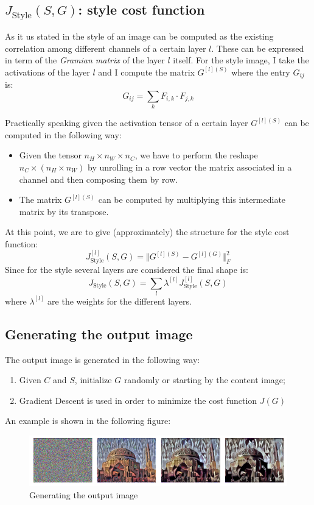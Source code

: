 \subsection{$J_{\text{Style}}(S,G)$: style cost function}
As it us stated in \cite{gatys2015neural} the style of an image can be computed as the existing correlation among different channels of a certain layer $l$. These can be expressed in term of the \textit{Gramian matrix} of the layer $l$ itself. For the style image, I take the activations of the layer $l$ and I compute the matrix $G^{[l](S)}$ where the entry $G_{ij}$ is:
\begin{equation}
    G_{ij}=\sum_{k} {F_{i,k}\cdot F_{j,k}}
\end{equation}

Practically speaking given the activation tensor of a certain layer $G^{[l](S)}$ can be computed in the following way: 
\begin{itemize}
    \itemsep-0.2em
    \item Given the tensor $n_H\times{n_{W}}\times{n_{C}}$, we have to perform the reshape $n_{C}\times({n_{H}\times{n_{W}}})$ by unrolling in a row vector the matrix associated in a channel and then composing them by row.
    \item The matrix $G^{[l](S)}$ can be computed by multiplying this intermediate matrix by its transpose.
\end{itemize}
At this point, we are to give (approximately) the structure for the style cost function:
\begin{equation}
    J^{[l]}_{\text{Style}}(S,G)=\Vert G^{[l](S)}-G^{[l](G)} \Vert_F^2
\end{equation}
Since for the style several layers are considered the final shape is:
\begin{equation}
    J_{\text{Style}}(S,G)=\sum_{l}{ \lambda^{[l]} J^{[l]}_{\text{Style}}(S,G)}
\end{equation}
where $\lambda^{[l]}$ are the weights for the different layers.

\subsection{Generating the output image}
The output image is generated in the following way:
\begin{enumerate}
    \itemsep-0.2em
    \item Given $C$ and $S$, initialize $G$ randomly or starting by the content image; 
    \item Gradient Descent is used in order to minimize the cost function $J(G)$ 
\end{enumerate}
An example is shown in the following figure:
\begin{figure}[h]
    \centering
    \includegraphics[scale=1]{img/NeuralStyle_G.png}
    \caption{Generating the output image}
\end{figure}

